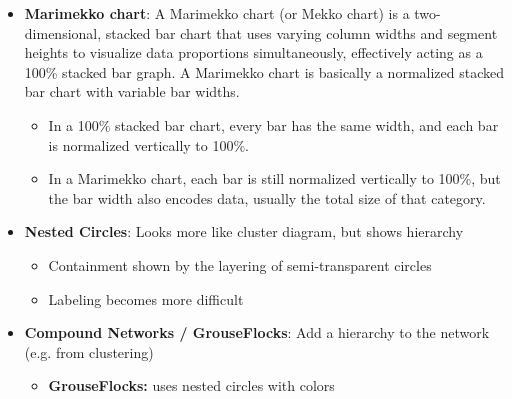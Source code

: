 \documentclass{report}
\begin{document}
\begin{itemize}
            \bigbreak \noindent 
        \item \textbf{Marimekko chart}: A Marimekko chart (or Mekko chart) is a two-dimensional, stacked bar chart that uses varying column widths and segment heights to visualize data proportions simultaneously, effectively acting as a 100\% stacked bar graph.
            \bigbreak \noindent 
            \bigbreak \noindent 
            A Marimekko chart is basically a normalized stacked bar chart with variable bar widths.
            \begin{itemize}
                \item In a 100\% stacked bar chart, every bar has the same width, and each bar is normalized vertically to 100\%.
                \item In a Marimekko chart, each bar is still normalized vertically to 100\%, but the bar width also encodes data, usually the total size of that category.
            \end{itemize}
        \item \textbf{Nested Circles}: Looks more like cluster diagram, but shows hierarchy
            \begin{itemize}
                \item Containment shown by the layering of semi-transparent circles
                \item Labeling becomes more difficult
            \end{itemize}
            \bigbreak \noindent 
        \item \textbf{Compound Networks / GrouseFlocks}: Add a hierarchy to the network (e.g. from clustering)
            \begin{itemize}
                \item \textbf{GrouseFlocks:} uses nested circles with colors
            \end{itemize}
            \bigbreak \noindent 
            





    \end{itemize}

    \pagebreak 
\end{document}
